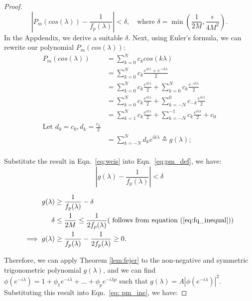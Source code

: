 \documentclass[preprint]{aastex}
\theoremstyle{nonitalicname}
\theoremstyle{plain}
\theoremstyle{remark}
\begin{document}
\begin{proof}
\begin{equation}\label{eq:pm_def}
\left|P_m(cos(\lambda)) - \frac{1}{f_p(\lambda)}\right| < \delta, \quad \text{where } \delta = \min \left( \frac{1}{2M}, \frac{\epsilon}{4M^2} \right). 
\end{equation}
In the Appdendix, we derive a suitable $\delta$. 
Next, using Euler's formula, we can rewrite our polynomial $P_m(cos(\lambda))$:
\begin{equation}\label{eq:weis}
\begin{aligned}
    P_m(cos(\lambda)) &= \sum_{k=0}^N c_k cos(k\lambda)\\
    &= \sum_{k=0}^N c_k \frac{e^{ik \lambda}+e^{-ik \lambda}}{2}\\
    &= \sum_{k=0}^N c_k \frac{e^{ik \lambda}}{2} + \sum_{k=0}^N c_k \frac{e^{-ik \lambda}}{2} \\
    &=  \sum_{k=0}^N c_k \frac{e^{ik \lambda}}{2} + \sum_{k=-N}^0 c_{-k} \frac{e^{ik \lambda}}{2} \\
    &=  \sum_{k=1}^N c_k \frac{e^{ik \lambda}}{2} + \sum_{k=-N}^{-1} c_{k} \frac{e^{ik \lambda}}{2} + c_0\\
    \text{Let } d_0 = c_0, d_k = \frac{c_k}{2}\\
    & = \sum_{k=-N}^N d_k e^{ik \lambda} \triangleq g(\lambda);\\
\end{aligned} 
\end{equation}

Substitute the result in  Eqn.~\ref{eq:weis} into  Eqn.~\ref{eq:pm_def}, we have: 
\begin{equation}\label{eq: pm_ine}
    \left|g(\lambda) - \frac{1}{f_p(\lambda)}\right| < \delta
\end{equation}

\begin{equation}
    \begin{aligned}
        g(\lambda) &\geq \frac{1}{f_p(\lambda)} - \delta \\
        \delta & \leq \frac{1}{2M} \leq \frac{1}{2 f_p(\lambda)} (\text{ follows from equation } (\ref{eq:fq_inequal}))\\
        \implies g(\lambda) & \geq \frac{1}{f_p(\lambda)} - \frac{1}{2 f_p(\lambda)} \geq 0.
    \end{aligned}
\end{equation}

Therefore, we can apply Theorem \ref{lem:fejer} to the non-negative and symmetric trigonometric polynomial $g(\lambda)$, and we can find $\phi(e^{-i \lambda}) = 1+ \phi_1e^{-i \lambda} + ...+ \phi_p e^{-i \lambda p}$ such that $g(\lambda) = A|\phi(e^{-i \lambda})|^2$. Substituting this result into Eqn.~\ref{eq: pm_ine}, we have:


\end{proof}
\end{document}
